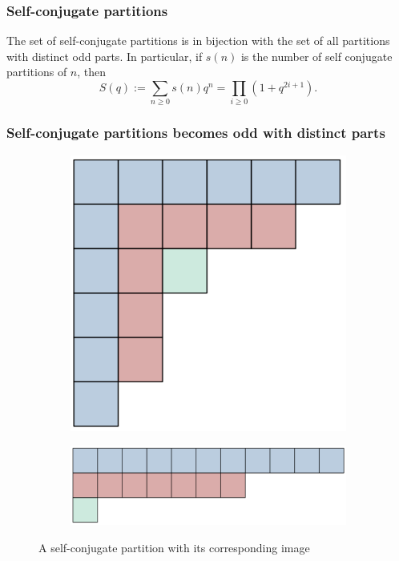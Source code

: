 \documentclass{beamer}
\begin{document}
\begin{frame}
\frametitle{Self-conjugate partitions}
\begin{theorem}
The set of self-conjugate partitions is in bijection with the set of all partitions with distinct odd parts. In particular, if $s(n)$ is the number of self conjugate partitions of $n$, then
$$S(q) := \sum_{n\geq 0}s(n)q^n = \prod_{i\geq 0}(1+q^{2i+1}).$$
\end{theorem}
\end{frame}

\begin{frame}
\frametitle{Self-conjugate partitions becomes odd with distinct parts}

\begin{figure}
     \centering
     \begin{subfigure}[b]{0.25\textwidth}
         \centering
         \includegraphics[width=\textwidth]{self_conjugate_colored.png}
     \end{subfigure}
     \hfill
     \begin{subfigure}[b]{0.5\textwidth}
         \centering
         \includegraphics[width=\textwidth]{odd_distinct_colored.png}
     \end{subfigure}
        \caption{A self-conjugate partition with its corresponding image}
        \label{fig:three graphs}
\end{figure}

\end{frame}
\end{document}
